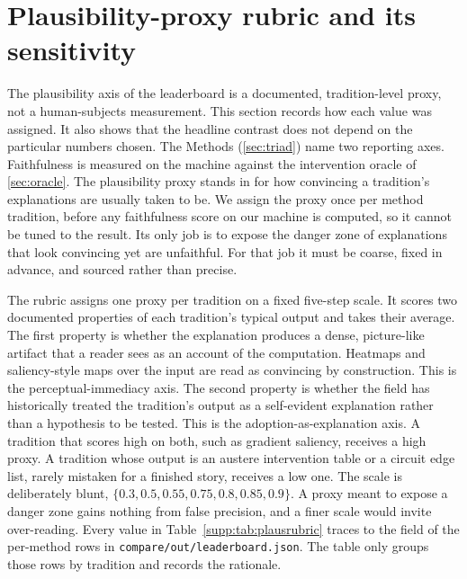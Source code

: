 \section{Plausibility-proxy rubric and its sensitivity}\label{supp:plausibility}

The plausibility axis of the leaderboard is a documented, tradition-level proxy, not a
human-subjects measurement. This section records how each value was assigned. It also shows
that the headline contrast does not depend on the particular numbers chosen. The Methods
(\Sectionname\ref{sec:triad}) name two reporting axes. Faithfulness is measured on the machine against the
intervention oracle of \Sectionname\ref{sec:oracle}. The plausibility proxy stands in for how convincing a
tradition's explanations are usually taken to be. We assign the proxy once per method
tradition, before any faithfulness score on our machine is computed, so it cannot be tuned to
the result. Its only job is to expose the danger zone of explanations that look convincing yet
are unfaithful. For that job it must be coarse, fixed in advance, and sourced rather than
precise.

The rubric assigns one proxy per tradition on a fixed five-step scale. It scores two
documented properties of each tradition's typical output and takes their average. The first
property is whether the explanation produces a dense, picture-like artifact that a reader sees
as an account of the computation. Heatmaps and saliency-style maps over the input are read as
convincing by construction. This is the perceptual-immediacy axis. The second property is
whether the field has historically treated the tradition's output as a self-evident
explanation rather than a hypothesis to be tested. This is the adoption-as-explanation axis. A
tradition that scores high on both, such as gradient saliency, receives a high proxy. A
tradition whose output is an austere intervention table or a circuit edge list, rarely
mistaken for a finished story, receives a low one. The scale is deliberately blunt,
$\{0.3,0.5,0.55,0.75,0.8,0.85,0.9\}$. A proxy meant to expose a danger zone gains nothing from
false precision, and a finer scale would invite over-reading. Every value in
Table~\ref{supp:tab:plausrubric} traces to the  field of the
per-method rows in \texttt{compare/out/leaderboard.json}. The table only groups those rows by
tradition and records the rationale.

